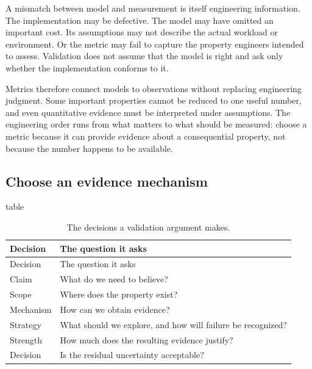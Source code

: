 A mismatch between model and measurement is itself engineering information. The implementation may be
defective. The model may have omitted an important cost. Its assumptions may not describe the actual
workload or environment. Or the metric may fail to capture the property engineers intended to assess.
Validation does not assume that the model is right and ask only whether the implementation conforms
to it.

Metrics therefore connect models to observations without replacing engineering judgment. Some
important properties cannot be reduced to one useful number, and even quantitative evidence must be
interpreted under assumptions. The engineering order runs from what matters to what should be
measured: choose a metric because it can provide evidence about a consequential property, not because
the number happens to be available.

\subsection{Choose an evidence mechanism}\label{sec-choosing-evidence}

\begin{bookbox}{table}{} %
\begin{longtable}[]{@{}
  >{\raggedright\arraybackslash}p{}
  >{\raggedright\arraybackslash}p{}@{}}
\caption{The decisions a validation argument makes.}\label{tbl-validation-skeleton}\tabularnewline
\toprule\noalign{}
\begin{minipage}[b]{\linewidth}\raggedright
Decision
\end{minipage} & \begin{minipage}[b]{\linewidth}\raggedright
The question it asks
\end{minipage} \\
\midrule\noalign{}
\endfirsthead
\toprule\noalign{}
\begin{minipage}[b]{\linewidth}\raggedright
Decision
\end{minipage} & \begin{minipage}[b]{\linewidth}\raggedright
The question it asks
\end{minipage} \\
\midrule\noalign{}
\endhead
\bottomrule\noalign{}
\endlastfoot
Claim & What do we need to believe? \\
Scope & Where does the property exist? \\
Mechanism & How can we obtain evidence? \\
Strategy & What should we explore, and how will failure be recognized? \\
Strength & How much does the resulting evidence justify? \\
Decision & Is the residual uncertainty acceptable? \\
\end{longtable}
\end{bookbox}

